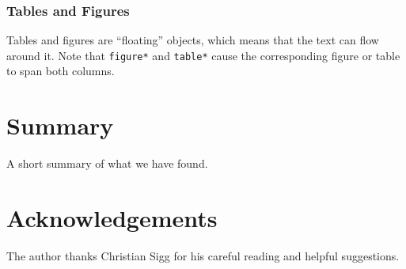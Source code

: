 \documentclass[10pt,conference,compsocconf]{IEEEtran}
\begin{document}
\subsubsection{Tables and Figures}

Tables and figures are ``floating'' objects, which means that the text
can flow around it.
Note
that \texttt{figure*} and \texttt{table*} cause the corresponding
figure or table to span both columns.



\section{Summary}

A short summary of what we have found.

\section*{Acknowledgements}
The author thanks Christian Sigg for his careful reading and helpful
suggestions.



\end{document}
